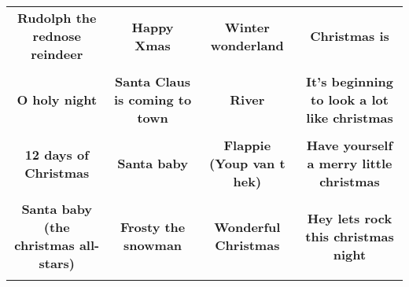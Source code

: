 \documentclass[12pt]{article} \usepackage{eso-pic, graphicx}
\newcommand{\background}[1]{%
\AddToShipoutPictureBG*{\texttt{[image: \#1]}}
}
\begin{document}
\tabcolsep=30.2pt \renewcommand{\arraystretch}{4.5}   \vspace*{4.3cm} \begin{center}  \begin{tabular}{c c c c}
\parbox{3cm}{\centering \textbf{Rudolph the rednose reindeer}}& 
\parbox{3cm}{\centering \textbf{Happy Xmas}}& 
\parbox{3cm}{\centering \textbf{Winter wonderland}}& 
\parbox{3cm}{\centering \textbf{Christmas is}}\\ \\ 
\parbox{3cm}{\centering \textbf{O holy night}}& 
\parbox{3cm}{\centering \textbf{Santa Claus is coming to town}}& 
\parbox{3cm}{\centering \textbf{River}}& 
\parbox{3cm}{\centering \textbf{It’s beginning to look a lot like christmas}}\\ \\ 
\parbox{3cm}{\centering \textbf{12 days of Christmas}}& 
\parbox{3cm}{\centering \textbf{Santa baby}}& 
\parbox{3cm}{\centering \textbf{Flappie (Youp van t hek)}}& 
\parbox{3cm}{\centering \textbf{Have yourself a merry little christmas}}\\ \\ 
\parbox{3cm}{\centering \textbf{Santa baby (the christmas all-stars)}}& 
\parbox{3cm}{\centering \textbf{Frosty the snowman}}& 
\parbox{3cm}{\centering \textbf{Wonderful Christmas}}& 
\parbox{3cm}{\centering \textbf{Hey lets rock this christmas night}}\\ \\ 
\end{tabular} \background{discobingo.pdf} \end{center} 
\end{document}
